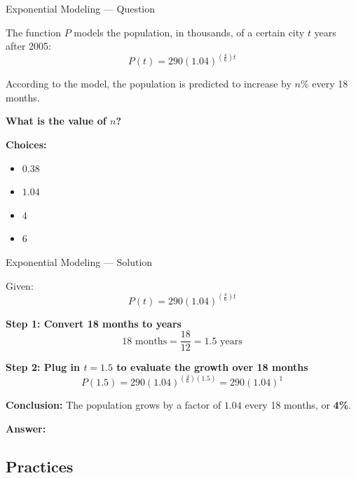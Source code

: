 \documentclass{beamer}
\begin{document}
\begin{frame}{Exponential Modeling — Question}
\small

The function $P$ models the population, in thousands, of a certain city $t$ years after 2005:
\[
P(t) = 290(1.04)^{\left( \frac{4}{6} \right)t}
\]

According to the model, the population is predicted to increase by $n\%$ every 18 months. 

\textbf{What is the value of $n$?}

\vspace{0.5cm}
\textbf{Choices:}
\begin{itemize}
    \item[A.] $0.38$
    \item[B.] $1.04$
    \item[C.] $4$
    \item[D.] $6$
\end{itemize}

\end{frame}


\begin{frame}{Exponential Modeling — Solution}
\small

Given:
\[
P(t) = 290(1.04)^{\left( \frac{4}{6} \right)t}
\]

\textbf{Step 1: Convert 18 months to years}
\[
18 \text{ months} = \frac{18}{12} = 1.5 \text{ years}
\]

\textbf{Step 2: Plug in $t = 1.5$ to evaluate the growth over 18 months}
\[
P(1.5) = 290(1.04)^{\left( \frac{4}{6} \right)(1.5)} = 290(1.04)^1
\]

\textbf{Conclusion:} The population grows by a factor of $1.04$ every 18 months, or \textbf{4\%}.

\vspace{0.3cm}
\textbf{Answer:} 
\end{frame}



\begin{frame}
\section{Practices}
\end{frame}
\end{document}
